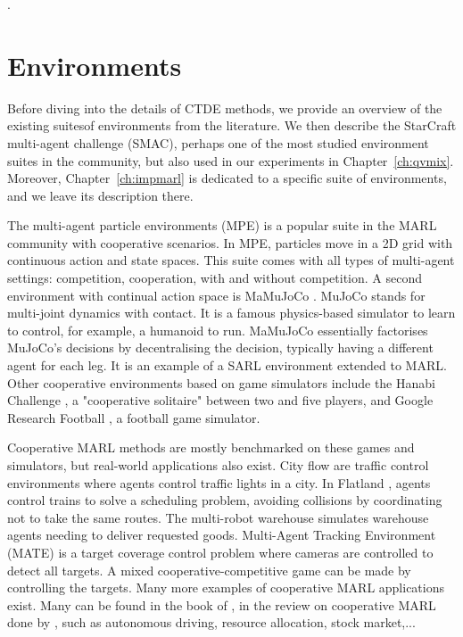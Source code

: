 .

\section{Environments}
\label{sec:ch3_env}
Before diving into the details of CTDE methods, we provide an overview of the existing suites\footnotemark  of environments from the literature.
We then describe the StarCraft multi-agent challenge (SMAC), perhaps one of the most studied environment suites in the community, but also used in our experiments in Chapter~\ref{ch:qvmix}.
Moreover, Chapter~\ref{ch:impmarl} is dedicated to a specific suite of environments, and we leave its description there.


The multi-agent particle environments (MPE) \citep{lowe2017multi} is a popular suite in the MARL community with cooperative scenarios.
In MPE, particles move in a 2D grid with continuous action and state spaces.
This suite comes with all types of multi-agent settings: competition, cooperation, with and without competition.
A second environment with continual action space is MaMuJoCo \citep{peng2021facmac}.
MuJoCo \citep{todorov2012mujoco} stands for multi-joint dynamics with contact.
It is a famous physics-based simulator to learn to control, for example, a humanoid to run.
MaMuJoCo essentially factorises MuJoCo's decisions by decentralising the decision, typically having a different agent for each leg.
It is an example of a SARL environment extended to MARL.
Other cooperative environments based on game simulators include the Hanabi Challenge \citep{Bard_2020}, a "cooperative solitaire" between two and five players, and Google Research Football \citep{kurach2020google}, a football game simulator.

Cooperative MARL methods are mostly benchmarked on these games and simulators, but real-world applications also exist.
City flow \citep{zhang2019cityflow} are traffic control environments where agents control traffic lights in a city.
In Flatland \citep{mohanty2020flatland}, agents control trains to solve a scheduling problem, avoiding collisions by coordinating not to take the same routes.
The multi-robot warehouse \citep{papoudakis2021benchmarking, christianos2020shared} simulates warehouse agents needing to deliver requested goods.
Multi-Agent Tracking Environment (MATE) \citep{NEURIPS2022_b2a1c152} is a target coverage control problem where cameras are controlled to detect all targets.
A mixed cooperative-competitive game can be made by controlling the targets.
Many more examples of cooperative MARL applications exist.
Many can be found in the book of \cite{marl-book}, in the review on cooperative MARL done by \cite{oroojlooy2022review}, such as autonomous driving, resource allocation, stock market,...

